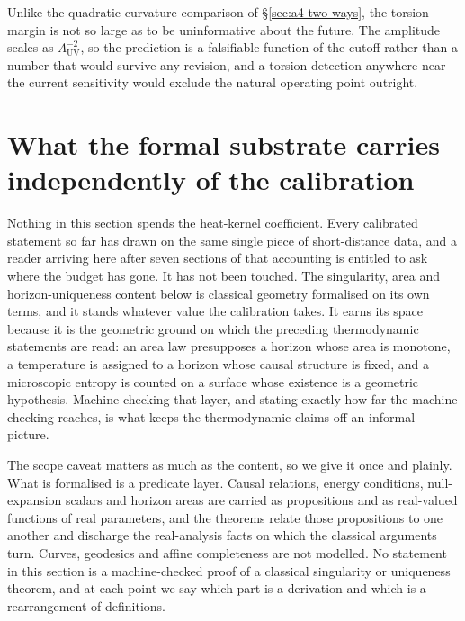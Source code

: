 \documentclass[aps,prd,nofootinbib,superscriptaddress,12pt]{revtex4-2}
\begin{document}
Unlike the quadratic-curvature comparison of \S\ref{sec:a4-two-ways}, the
torsion margin is not so large as to be uninformative about the future. The
amplitude scales as $\Lambda_{\mathrm{UV}}^{-2}$, so the prediction is a
falsifiable function of the cutoff rather than a number that would survive any
revision, and a torsion detection anywhere near the current sensitivity would
exclude the natural operating point outright.

\section{What the formal substrate carries independently of the calibration}
\label{sec:bh-theorems}

Nothing in this section spends the heat-kernel coefficient. Every calibrated
statement so far has drawn on the same single piece of short-distance data, and a
reader arriving here after seven sections of that accounting is entitled to ask
where the budget has gone. It has not been touched. The singularity, area and
horizon-uniqueness content below is classical geometry formalised on its own
terms, and it stands whatever value the calibration takes. It earns its space
because it is the geometric ground on which the preceding thermodynamic
statements are read: an area law presupposes a horizon whose area is monotone, a
temperature is assigned to a horizon whose causal structure is fixed, and a
microscopic entropy is counted on a surface whose existence is a geometric
hypothesis. Machine-checking that layer, and stating exactly how far the machine
checking reaches, is what keeps the thermodynamic claims off an informal picture.

The scope caveat matters as much as the content, so we give it once and plainly.
What is formalised is a predicate layer. Causal relations, energy conditions,
null-expansion scalars and horizon areas are carried as propositions and as
real-valued functions of real parameters, and the theorems relate those
propositions to one another and discharge the real-analysis facts on which the
classical arguments turn. Curves, geodesics and affine completeness are not
modelled. No statement in this section is a machine-checked proof of a classical
singularity or uniqueness theorem, and at each point we say which part is a
derivation and which is a rearrangement of definitions.
\end{document}
